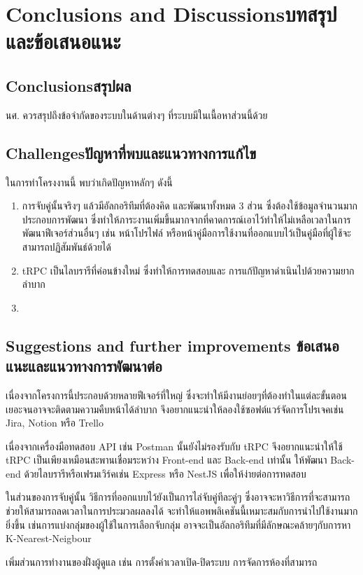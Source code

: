\chapter{\ifenglish Conclusions and Discussions\else บทสรุปและข้อเสนอแนะ\fi}

\section{\ifenglish Conclusions\else สรุปผล\fi}

นศ. ควรสรุปถึงข้อจำกัดของระบบในด้านต่างๆ ที่ระบบมีในเนื้อหาส่วนนี้ด้วย

\section{\ifenglish Challenges\else ปัญหาที่พบและแนวทางการแก้ไข\fi}

ในการทำโครงงานนี้ พบว่าเกิดปัญหาหลักๆ ดังนี้
\begin{enumerate}
  \item การจับคู่นั้นจริงๆ แล้วมีอัลกอริทึมที่ต้องคิด และพัฒนาทั้งหมด 3 ส่วน ซึ่งต้องใช้ข้อมูลจำนวนมากประกอบการพัฒนา
        ซึ่งทำให้ภาระงานเพิ่มขึ้นมากจากที่คาดการณ์เอาไว้ทำให้ไม่เหลือเวลาในการพัฒนาฟีเจอร์ส่วนอื่นๆ เช่น หน้าโปรไฟล์ หรือหน้าคู่มือการใช้งานที่ออกแบบไว้เป็นคู่มือที่ผู้ใช้จะสามารถปฏิสัมพันธ์ด้วยได้
  \item tRPC เป็นไลบรารีที่ค่อนข้างใหม่ ซึ่งทำให้การทดสอบและ การแก้ปัญหาดำเนินไปด้วยความยากลำบาก
  \item 
\end{enumerate}


\section{\ifenglish%
Suggestions and further improvements
\else%
ข้อเสนอแนะและแนวทางการพัฒนาต่อ
\fi
}
เนื่องจากโครงการนี้ประกอบด้วยหลายฟีเจอร์ที่ใหญ่ ซึ่งจะทำให้มีงานย่อยๆที่ต้องทำในแต่ละขั้นตอนเยอะจนอาจจะติดตามความคืบหน้าได้ลำบาก
จึงอยากแนะนำให้ลองใช้ซอฟต์แวร์จัดการโปรเจคเช่น Jira, Notion หรือ Trello

เนื่องจากเครื่องมือทดสอบ API เช่น Postman นั้นยังไม่รองรับกับ tRPC จึงอยากแนะนำให้ใช้ tRPC เป็นเพียงเหมือนสะพานเชื่อมระหว่าง Front-end
และ Back-end เท่านั้น ให้พัฒนา Back-end ด้วยไลบรารีหรือเฟรมเวิร์คเช่น Express หรือ NestJS เพื่อให้ง่ายต่อการทดสอบ

ในส่วนของการจับคู่นั้น วิธีการที่ออกแบบไว้ยังเป็นการไล่จับคู่ทีละคู่ๆ ซึ่งอาจจะหาวิธีการที่จะสามารถช่วยให้สามารถลดเวลาในการประมวลผลลงได้ 
จะทำให้แอพพลิเคชันนี้เหมาะสมกับการนำไปใช้งานมากยิ่งขึ้น เช่นการแบ่งกลุ่มของผู้ใช้ในการเลือกจับกลุ่ม อาจจะเป็นอัลกอริทึมที่มีลักษณะคล้ายๆกับการหา 
K-Nearest-Neigbour

เพิ่มส่วนการทำงานของฝั่งผู้ดูแล เช่น การตั้งค่าเวลาเปิด-ปิดระบบ การจัดการห้องที่สามารถ
